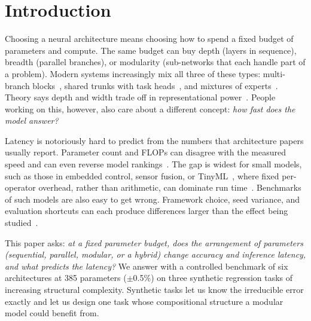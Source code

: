 \section{Introduction}
\label{sec:intro}

Choosing a neural architecture means choosing how to spend a fixed budget of parameters and compute. The same
budget can buy depth (layers in sequence), breadth (parallel branches), or modularity
(sub-networks that each handle part of a problem). Modern systems increasingly mix all three of these types: multi-branch
blocks~\cite{szegedy2015going,xie2017resnext}, shared trunks with task heads~\cite{caruana1997multitask}, and
mixtures of experts~\cite{shazeer2017outrageously}. Theory says depth and width trade off in representational
power~\cite{eldan2016power,lu2017expressive}. People working on this, however, also care about a different concept:
\emph{how fast does the model answer?}

Latency is notoriously hard to predict from the numbers that architecture papers usually report. Parameter
count and FLOPs can disagree with the measured speed and can even reverse model
rankings~\cite{ma2018shufflenetv2,dehghani2022efficiency}. The gap is widest for small models, such as those in
embedded control, sensor fusion, or TinyML~\cite{banbury2021mlperftiny}, where fixed per-operator overhead,
rather than arithmetic, can dominate run time~\cite{sze2017efficient}. Benchmarks of such models are also easy to
get wrong. Framework choice, seed variance, and evaluation shortcuts can each produce differences larger
than the effect being studied~\cite{shi2016benchmarking,bouthillier2021accounting}.

This paper asks: \emph{at a fixed parameter budget, does the arrangement of parameters (sequential, parallel,
modular, or a hybrid) change accuracy and inference latency, and what predicts the latency?} We answer with a
controlled benchmark of six architectures at 385 parameters ($\pm$0.5\%) on three synthetic regression tasks of
increasing structural complexity. Synthetic tasks let us know the irreducible error exactly and let us design one task
whose compositional structure a modular model could benefit from.

